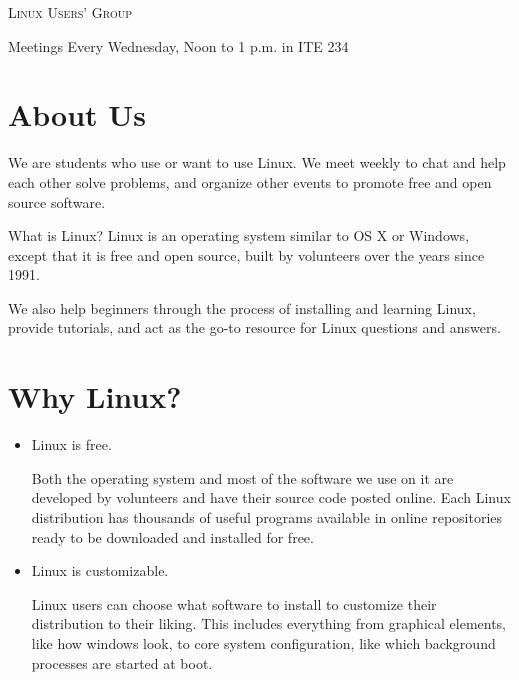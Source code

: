 \documentclass[11pt]{article}
\begin{document}
\begin{multicols*}{2}

\begin{center} \scshape \Huge
    Linux Users' Group
    \vspace{-1em}
\end{center}

\begin{center} \Large
    Meetings
    Every Wednesday, Noon to 1 p.m. in ITE 234
\end{center}

\vspace{-3em}

\section*{About Us}

We are students who use or want to use Linux. We meet weekly to chat and help
each other solve problems, and organize other events to promote free and open
source software.

What is Linux? Linux is an operating system similar to OS X or Windows, except
that it is free and open source, built by volunteers over the years since 1991.

We also help beginners through the process of installing and learning Linux,
provide tutorials, and act as the go-to resource for Linux questions and
answers.

\section*{Why Linux?}

\begin{itemize}
\item Linux is free.

  Both the operating system and most of the software we use on it are developed by
  volunteers and have their source code posted online. Each Linux distribution has
  thousands of useful programs available in online repositories ready to be downloaded and
  installed for free.

\item Linux is customizable.

  Linux users can choose what software to install to customize their
  distribution to their liking. This includes everything from graphical
  elements, like how windows look, to core system configuration, like which
  background processes are started at boot.


\end{itemize}
\end{multicols*}
\end{document}
